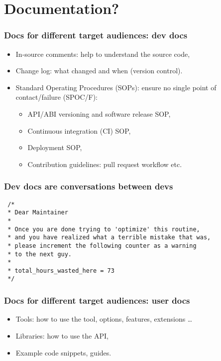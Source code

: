 \section{Documentation?}
\begin{frame}[c]
  \frametitle{Docs for different target audiences: dev docs}
  \begin{itemize}
    \item In-source comments: help to understand the source code,
    \item Change log: what changed and when (version control).
    \item Standard Operating Procedures (SOPs): ensure no single point of contact/failure (SPOC/F):
      \begin{itemize}
        \item API/ABI versioning and software release SOP,
        \item Continuous integration (CI) SOP,
        \item Deployment SOP,
        \item Contribution guidelines: pull request workflow etc.
      \end{itemize}
  \end{itemize}
\end{frame}
\begin{frame}[fragile]
  \frametitle{Dev docs are conversations between devs}
  \begin{verbatim}
 /*
 * Dear Maintainer
 *
 * Once you are done trying to 'optimize' this routine,
 * and you have realized what a terrible mistake that was,
 * please increment the following counter as a warning
 * to the next guy.
 *
 * total_hours_wasted_here = 73
 */
  \end{verbatim}
\end{frame}
\begin{frame}[c]
  \frametitle{Docs for different target audiences: user docs}
  \begin{itemize}
    \item Tools: how to \alert{use} the tool, options, features, extensions \ldots{}
    \item Libraries: how to \alert{use} the API,
    \item Example code snippets, guides.
  \end{itemize}
\end{frame}

